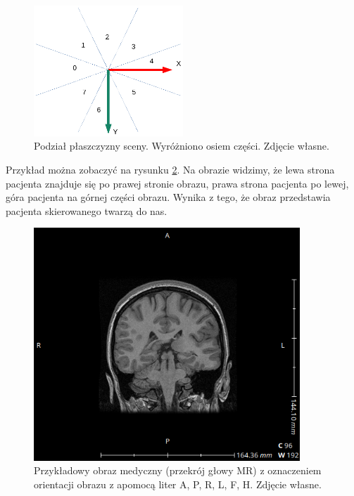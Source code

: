\begin{figure}[!htbp]
    \centering
    \includegraphics[width=0.5\textwidth]{img/imageorientationindicator-004.pdf}
    \caption{Podział płaszczyzny sceny. Wyróżniono osiem części. Zdjęcie własne.} 
    \label{fig:imageorientationindicator4}
\end{figure}

\par
Przykład można zobaczyć na rysunku \ref{fig:imageorientationindicator1}.
Na obrazie widzimy, że lewa strona pacjenta znajduje się po prawej stronie obrazu, prawa strona pacjenta po lewej, góra pacjenta na górnej części obrazu.
Wynika z tego, że obraz przedstawia pacjenta skierowanego twarzą do nas.

\begin{figure}[!htbp]
    \centering
    \includegraphics[width=100mm]{img/imageorientationindicator-002.png}
    \caption{Przykładowy obraz medyczny (przekrój głowy MR) z oznaczeniem orientacji obrazu z apomocą liter A, P, R, L, F, H. Zdjęcie własne.}
    \label{fig:imageorientationindicator1}
\end{figure}
